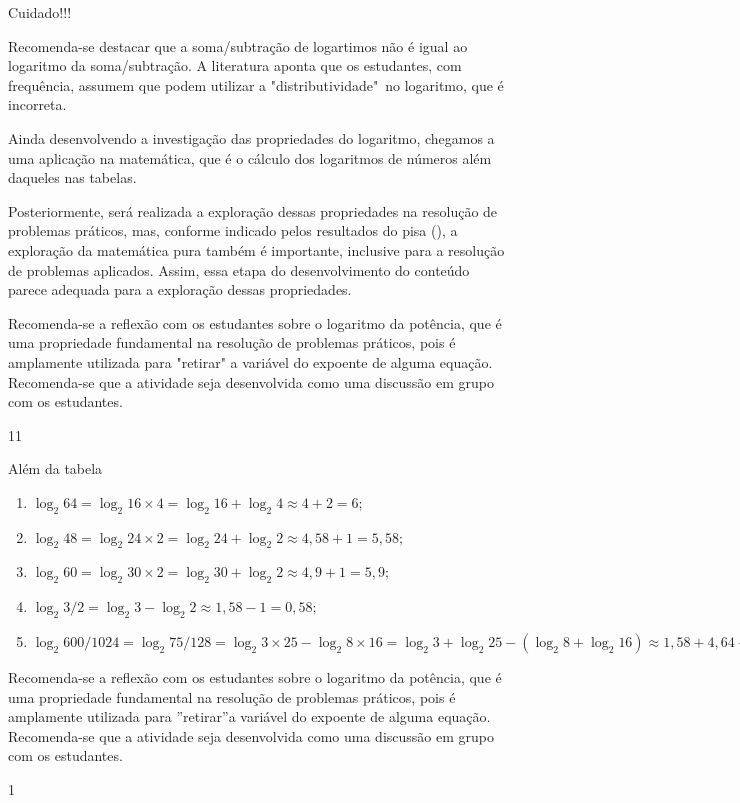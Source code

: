 \begin{sugestions}{Cuidado!!!}
{
	Recomenda-se destacar que a soma/subtração de logartimos não é igual ao logaritmo da soma/subtração. A literatura aponta que os estudantes, com frequência, assumem que podem utilizar a "distributividade"\, no logaritmo, que é incorreta.


	Ainda desenvolvendo a investigação das propriedades do logaritmo, chegamos a uma aplicação na matemática, que é o cálculo dos logaritmos de números além daqueles nas tabelas.

	Posteriormente, será realizada a exploração dessas propriedades na resolução de problemas práticos, mas, conforme indicado pelos resultados do pisa (\cite{OCDE2016}), a exploração da matemática pura também é importante, inclusive para a resolução de problemas aplicados. Assim, essa etapa do desenvolvimento do conteúdo parece adequada para a exploração dessas propriedades.


	Recomenda-se a reflexão com os estudantes sobre o logaritmo da potência, que é uma propriedade fundamental na resolução de problemas práticos, pois é amplamente utilizada para "retirar" a variável do expoente de alguma equação. Recomenda-se que a atividade seja desenvolvida como uma discussão em grupo com os estudantes.
}{1}{1}
\end{sugestions}
\begin{answer}{Além da tabela}
{
	\begin{enumerate}
	\item $\log_2 64 = \log_2 16 \times 4= \log_2 16 + \log_2 4 \approx 4+2 =6$;
	\item $\log_2 48 = \log_2 24 \times 2= \log_2 24 + \log_2 2 \approx 4{,}58+1 =5{,}58;$
	\item $\log_2 60 = \log_2 30 \times 2= \log_2 30 + \log_2 2 \approx 4{,}9+1 =5{,}9;$
	\item $\log_2 3/2 = \log_2 3 - \log_2 2 \approx 1{,}58-1 =0{,}58;$
	\item $\log_2 600/1024 = \log_2 75/128= \log_2 3 \times 25- \log_2 8 \times 16= \log_2 3 + \log_2 25- (\log_2 8 +\log_2 16) \approx 1{,}58 + 4{,}64-(3+4)= 6{,}22-7 = -0{,}78.$
	\end{enumerate}


Recomenda-se a reflexão com os estudantes sobre o logaritmo da potência,
que é uma propriedade fundamental na resolução de problemas
práticos, pois é amplamente utilizada para ”retirar”a variável do
expoente de alguma equação. Recomenda-se que a atividade seja desenvolvida
como uma discussão em grupo com os estudantes.
}{1}
\end{answer}
